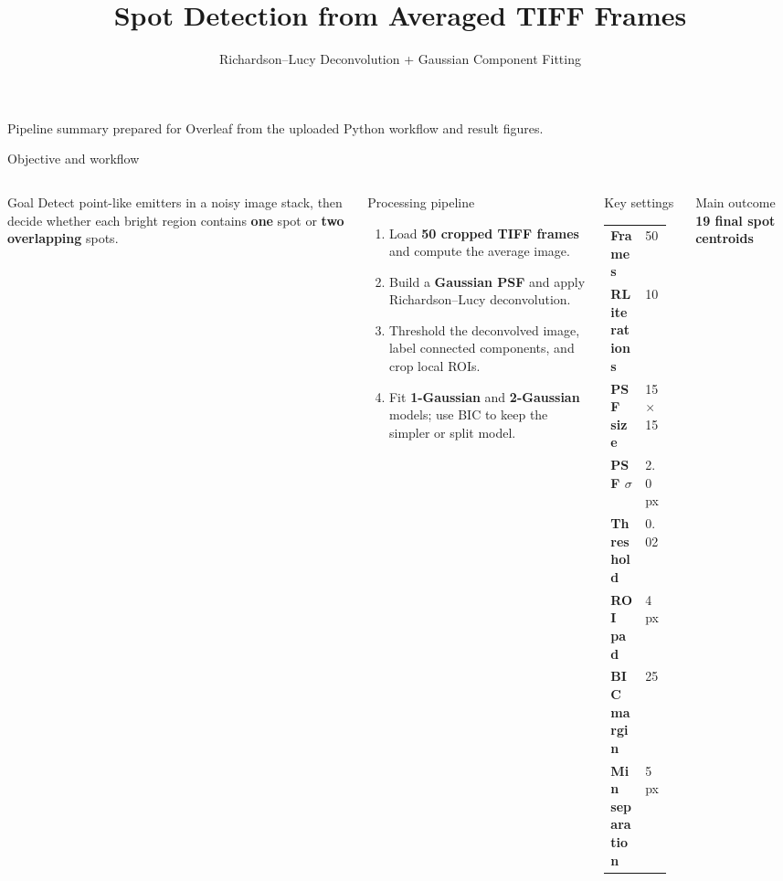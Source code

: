 \documentclass[aspectratio=169]{beamer}
\title{Spot Detection from Averaged TIFF Frames}
\subtitle{Richardson--Lucy Deconvolution + Gaussian Component Fitting}
\author{}
\date{}
\begin{document}
\begin{frame}
    \titlepage
    \vspace{-0.4em}
    \begin{center}
        \small Pipeline summary prepared for Overleaf from the uploaded Python workflow and result figures.
    \end{center}
\end{frame}

\begin{frame}{Objective and workflow}
\begin{columns}[T,totalwidth=\textwidth]
\begin{block}{Goal}
Detect point-like emitters in a noisy image stack, then decide whether each bright region contains \textbf{one} spot or \textbf{two overlapping} spots.
\end{block}

\begin{block}{Processing pipeline}
\small
\begin{enumerate}
    \item Load \textbf{50 cropped TIFF frames} and compute the average image.
    \item Build a \textbf{Gaussian PSF} and apply Richardson--Lucy deconvolution.
    \item Threshold the deconvolved image, label connected components, and crop local ROIs.
    \item Fit \textbf{1-Gaussian} and \textbf{2-Gaussian} models; use BIC to keep the simpler or split model.
\end{enumerate}
\end{block}

\begin{block}{Key settings}
\small
\begin{tabular}{>{\bfseries}p{0.48\linewidth}p{0.38\linewidth}}
Frames & 50 \\
RL iterations & 10 \\
PSF size & 15 $\times$ 15 \\
PSF $\sigma$ & 2.0 px \\
Threshold & 0.02 \\
ROI pad & 4 px \\
BIC margin & 25 \\
Min separation & 5 px \\
\end{tabular}
\end{block}

\vspace{0.3em}
\begin{alertblock}{Main outcome}
\centering
\Large \textbf{19 final spot centroids}
\end{alertblock}
\end{columns}
\end{frame}
\end{document}
